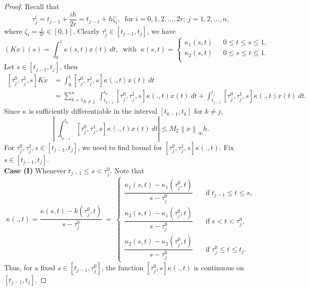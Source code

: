 \documentclass[sn-mathphys-num]{sn-jnl}%
\theoremstyle{thmstyleone}%
\theoremstyle{thmstyletwo}%
\theoremstyle{thmstylethree}%
\newcommand{\norm}[1]{\left\lVert #1\right\rVert}
\begin{document}
\begin{proof} Recall that
	$$
	\tau_j^i = t_{j-1} + \frac{ih}{2r} = t_{j-1}+h\zeta_i, ~ \text{ for } i = 0, 1, 2, \ldots, 2r; ~ j = 1, 2, \ldots, n,
	$$
	where $\zeta_{i} = \frac{i}{2r} \in [0, 1]$.
	Clearly $\tau_j^i \in [t_{j-1},t_j]$, we have
	\begin{equation*}
		(Kx)(s)=\int_0^1  \kappa(s,t) x(t) ~dt,
		~ \text{ with }~
		\kappa(s,t) = 
		\begin{cases}
			\kappa_1(s,t)    ~~~          & 0\leq t\leq s\leq 1,\\
			\kappa_2(s,t)    ~~~          & 0\leq s\leq t\leq 1.\\
		\end{cases} 
	\end{equation*} 
	Let $s \in [t_{j-1},t_j]$, then
	\begin{align} \label{Eq: 6}
		[\tau_j^0,\tau_j^1,s]Kx&=\int_0^1 [\tau_j^0,\tau_j^1,s] \kappa(.,t) x(t) ~dt \nonumber \\
		&= \underset{k \ne j}{\sum_{k=1}^{n}}~\int_{t_{k-1}}^{t_k} [\tau_j^0,\tau_j^1,s] \kappa(.,t) x(t) ~dt + \int_{t_{j-1}}^{t_j} [\tau_j^0,\tau_j^1,s] \kappa(.,t) x(t) ~dt. 
	\end{align}
	Since $\kappa$ is sufficiently differentiable in the interval $[t_{k-1},t_k]$ for $k \ne j$,
	\begin{equation}\label{Eq: 7}
		\left | ~\int_{t_{k-1}}^{t_k} [\tau_j^0,\tau_j^1,s] \kappa(.,t) x(t) ~dt \right | \le M_2 \norm{x}_\infty h.
	\end{equation}  
	For $\tau_j^0, \tau_j^1, s \in [t_{j-1},t_j]$, we need to find bound for $[\tau_j^0,\tau_j^1,s] \kappa(.,t)$. Fix $s \in [t_{j-1},{t_j}].$ \\
	\noindent
	\textbf{Case (I)}
	Whenever $t_{j-1} \le s < \tau_j^0$. Note that
	\begin{equation*}
		[\tau_j^0,s]\kappa(.,t) =\dfrac{\kappa(s,t)-k(\tau_j^0,t)}{s-\tau_j^0} ~=~
		\begin{cases}
			\dfrac{\kappa_1(s,t)-\kappa_1(\tau_j^0,t)}{s-\tau_j^0}  \quad &\text{if}\; t_{j-1} \le t \le s,\\
			\dfrac{\kappa_2(s,t)-\kappa_1(\tau_j^0,t)}{s-\tau_j^0}  \quad &\text{if}\; s < t < \tau_j^0,\\
			\dfrac{\kappa_2(s,t)-\kappa_2(\tau_j^0,t)}{s-\tau_j^0}  \quad &\text{if}\; \tau_j^0 \le t \le t_j.
		\end{cases}
	\end{equation*}	
	Thus, for a fixed $s \in [t_{j-1},\tau_j^0]$, the function $[\tau_j^0,s]\kappa(.,t)$ is continuous on $[t_{j-1},t_j].$

\end{proof}
\end{document}
